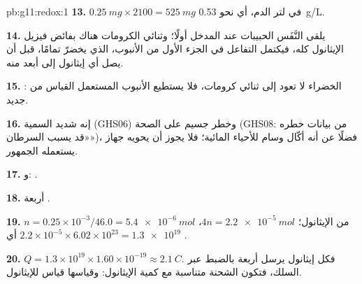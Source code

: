 \begin{solution}{pb:g11:redox:1}
\textbf{13.} $\qty{0.25}{mg} \times 2100 = \qty{525}{mg}$ في لتر
الدم، أي نحو \qty{0.53}{g/L}.

\textbf{14.} يلقى النَّفَس الحبيبات عند المدخل أولًا؛ وثنائي الكرومات هناك
بفائض فيزيل الإيثانول كله، فيكتمل التفاعل في الجزء الأول من
الأنبوب، الذي يخضرّ تمامًا، قبل أن يصل أي إيثانول إلى
أبعد منه.

\textbf{15.} :   الخضراء لا تعود
إلى ثنائي كرومات، فلا يستطيع الأنبوب المستعمل القياس من جديد.

\textbf{16.} إنه شديد السمية (GHS06) وخطر جسيم على الصحة
(GHS08: من بيانات خطره «قد يسبب السرطان»)، فضلًا عن أنه
أكّال وسام للأحياء المائية؛ فلا يجوز أن يحويه جهاز
يستعمله الجمهور.

\textbf{17.} 
و:
.

\textbf{18.} أربعة .

\textbf{19.} $n = 0.25\times 10^{-3}/46.0 = \qty{5.4e-6}{mol}$ من
الإيثانول؛  $4n = \qty{2.2e-5}{mol}$، أي
$2.2\times 10^{-5}\times 6.02\times 10^{23} = \num{1.3e19}$ .

\textbf{20.} $Q = 1.3\times 10^{19}\times 1.60\times 10^{-19} \approx
\qty{2.1}{C}$. فكل  إيثانول يرسل أربعة  بالضبط
عبر السلك، فتكون الشحنة متناسبة مع كمية
الإيثانول: وقياسها قياس للإيثانول.
\end{solution}
